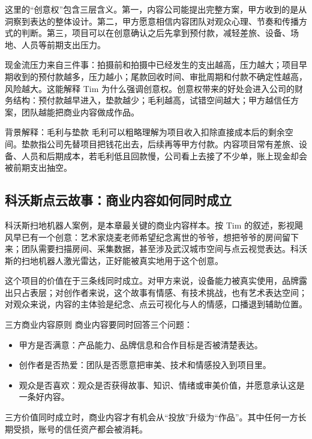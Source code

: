 \documentclass[a4paper]{article}
\begin{document}
这里的“创意权”包含三层含义。第一，内容公司能提出完整方案，甲方收到的是从洞察到表达的整体设计。第二，甲方愿意相信内容团队对观众心理、节奏和传播方式的判断。第三，项目可以在创意确认之后先拿到预付款，减轻差旅、设备、场地、人员等前期支出压力。

现金流压力来自三件事：拍摄前和拍摄中已经发生的支出越高，压力越大；项目早期收到的预付款越多，压力越小；尾款回收时间、审批周期和付款不确定性越高，风险越大。这能解释 Tim 为什么强调创意权。创意权带来的好处会进入公司的财务结构：预付款越早进入，垫款越少；毛利越高，试错空间越大；甲方越信任方案，团队越能把商业内容做成作品。

\begin{knowledgebox}{背景解释：毛利与垫款}
毛利可以粗略理解为项目收入扣除直接成本后的剩余空间。垫款指公司先替项目把钱花出去，后续再等甲方付款。内容项目常有差旅、设备、人员和后期成本，若毛利低且回款慢，公司看上去接了不少单，账上现金却会被前期支出抽空。
\end{knowledgebox}

\subsection{科沃斯点云故事：商业内容如何同时成立}

科沃斯扫地机器人案例，是本章最关键的商业内容样本。按 Tim 的叙述，影视飓风早已有一个创意：艺术家烧麦老师希望纪念离世的爷爷，想把爷爷的房间留下来；团队需要扫描房间、采集数据，甚至涉及武汉城市空间与点云视觉表达。科沃斯的扫地机器人激光雷达，正好能被真实地用于这个创意。

这个项目的价值在于三条线同时成立。对甲方来说，设备能力被真实使用，品牌露出只占表层；对创作者来说，这个故事有情感、有技术挑战，也有艺术表达空间；对观众来说，内容的主体验是纪念、点云可视化与人的情感，口播退到辅助位置。

\begin{importantbox}{三方商业内容原则}
商业内容要同时回答三个问题：

\begin{itemize}
  \item 甲方是否满意：产品能力、品牌信息和合作目标是否被清楚表达。
  \item 创作者是否热爱：团队是否愿意把审美、技术和情感投入到项目里。
  \item 观众是否喜欢：观众是否获得故事、知识、情绪或审美价值，并愿意承认这是一条好内容。
\end{itemize}

三方价值同时成立时，商业内容才有机会从“投放”升级为“作品”。其中任何一方长期受损，账号的信任资产都会被消耗。
\end{importantbox}
\end{document}
